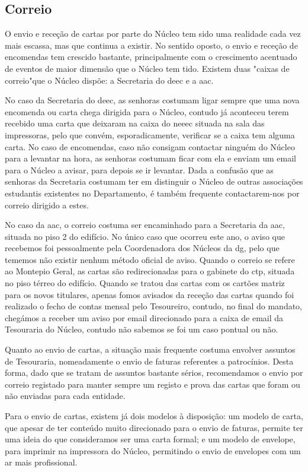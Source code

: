 
\subsection{Correio}

O envio e receção de cartas por parte do Núcleo tem sido uma realidade cada vez mais escassa, mas que continua a existir. No sentido oposto, o envio e receção de encomendas tem crescido bastante, principalmente com o crescimento acentuado de eventos de maior dimensão que o Núcleo tem tido. Existem duas "caixas de correio"\space que o Núcleo dispõe: a Secretaria do \acrshort{deec} e a \acrshort{aac}.

No caso da Secretaria do \acrshort{deec}, as senhoras costumam ligar sempre que uma nova encomenda ou carta chega dirigida para o Núcleo, contudo já aconteceu terem recebido uma carta que deixaram na caixa do \acrshort{neeec} situada na sala das impressoras, pelo que convém, esporadicamente, verificar se a caixa tem alguma carta. No caso de encomendas, caso não consigam contactar ninguém do Núcleo para a levantar na hora, as senhoras costumam ficar com ela e enviam um email para o Núcleo a avisar, para depois se ir levantar. Dada a confusão que as senhoras da Secretaria costumam ter em distinguir o Núcleo de outras associações estudantis existentes no Departamento, é também frequente contactarem-nos por correio dirigido a estes.

No caso da \acrshort{aac}, o correio costuma ser encaminhado para a Secretaria da \acrshort{aac}, situada no piso 2 do edifício. No único caso que ocorreu este ano, o aviso que recebemos foi pessoalmente pela Coordenadora dos Núcleos da \acrshort{dg}, pelo que tememos não existir nenhum método oficial de aviso. Quando o correio se refere ao Montepio Geral, as cartas são redirecionadas para o gabinete do \acrfull{ctp}, situada no piso térreo do edifício. Quando se tratou das cartas com os cartões matriz para os novos titulares, apenas fomos avisados da receção das cartas quando foi realizado o fecho de contas mensal pelo Tesoureiro, contudo, no final do mandato, chegámos a receber um aviso por email direcionado para a caixa de email da Tesouraria do Núcleo, contudo não sabemos se foi um caso pontual ou não.

Quanto ao envio de cartas, a situação mais frequente costuma envolver assuntos de Tesouraria, nomeadamente o envio de faturas referentes a patrocínios. Desta forma, dado que se tratam de assuntos bastante sérios, recomendamos o envio por correio registado para manter sempre um registo e prova das cartas que foram ou não enviadas para cada entidade.

Para o envio de cartas, existem já dois modelos à disposição: um modelo de carta, que apesar de ter conteúdo muito direcionado para o envio de faturas, permite ter uma ideia do que consideramos ser uma carta formal; e um modelo de envelope, para imprimir na impressora do Núcleo, permitindo o envio de envelopes com um ar mais profissional.